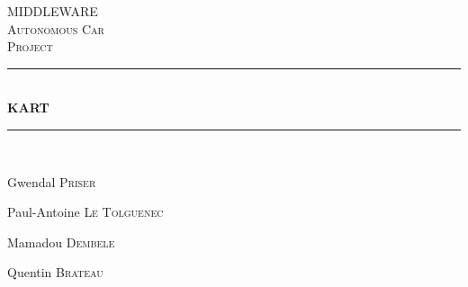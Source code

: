 \documentclass[12pt]{article}
\begin{document}
\begin{titlepage}
\newcommand{\HRule}{\rule{\linewidth}{0.1mm}} 
\center %
 
\textsc{\Large MIDDLEWARE}\\[0.5cm] %
\textsc{\Large Autonomous Car}\\[0.5cm] %
\textsc{\large Project }\\[0.5cm] %

\HRule \\[0.4cm]
{ \huge \bfseries KART}\\[0.1cm] %
\HRule \\[1.5cm]
 

\begin{minipage}{0.4\textwidth}
\begin{flushleft} \large
Gwendal \textsc{Priser}\\  %
\end{flushleft}

\begin{flushleft} \large
    Paul-Antoine \textsc{Le Tolguenec}\\  %
    \end{flushleft}
    \begin{flushleft} \large
        Mamadou \textsc{Dembele}\\  %
        \end{flushleft}
\end{minipage}
\begin{minipage}{0.4\textwidth}
    \begin{flushleft} \large
        Quentin \textsc{Brateau}\\  %
        \end{flushleft}


\end{minipage}
\end{titlepage}
\end{document}
